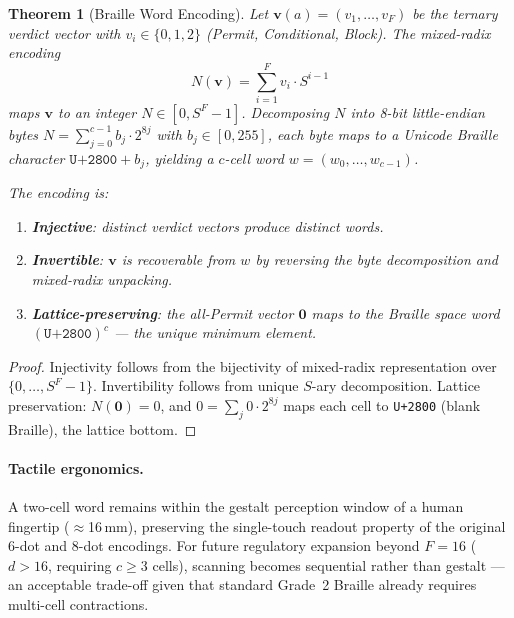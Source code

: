 \documentclass[11pt,twocolumn]{article}
\newtheorem{theorem}{Theorem}
\begin{document}
\begin{theorem}[Braille Word Encoding]
\label{thm:braille-word}
Let $\mathbf{v}(a) = (v_1, \ldots, v_F)$ be the ternary verdict vector
with $v_i \in \{0, 1, 2\}$ (Permit, Conditional, Block).
The mixed-radix encoding
\begin{equation}
  N(\mathbf{v}) = \sum_{i=1}^{F} v_i \cdot S^{i-1}
  \label{eq:mixed-radix}
\end{equation}
maps $\mathbf{v}$ to an integer $N \in [0, S^F - 1]$.
Decomposing $N$ into 8-bit little-endian bytes
$N = \sum_{j=0}^{c-1} b_j \cdot 2^{8j}$ with $b_j \in [0, 255]$,
each byte maps to a Unicode Braille character
$\texttt{U+2800} + b_j$, yielding a $c$-cell word
$w = (w_0, \ldots, w_{c-1})$.

\noindent
The encoding is:
\begin{enumerate}
  \item \textbf{Injective}: distinct verdict vectors produce distinct words.
  \item \textbf{Invertible}: $\mathbf{v}$ is recoverable from $w$ by
        reversing the byte decomposition and mixed-radix unpacking.
  \item \textbf{Lattice-preserving}: the all-Permit vector
        $\mathbf{0}$ maps to the Braille space word
        $(\texttt{U+2800})^c$ --- the unique minimum element.
\end{enumerate}
\end{theorem}

\begin{proof}
Injectivity follows from the bijectivity of mixed-radix representation
over $\{0,\ldots,S^F-1\}$. Invertibility follows from unique $S$-ary
decomposition. Lattice preservation: $N(\mathbf{0}) = 0$, and
$0 = \sum_{j} 0 \cdot 2^{8j}$ maps each cell to \texttt{U+2800}
(blank Braille), the lattice bottom.
\end{proof}

\paragraph{Tactile ergonomics.}
A two-cell word remains within the gestalt perception window of a
human fingertip ($\approx$16\,mm), preserving the single-touch readout
property of the original 6-dot and 8-dot encodings.
For future regulatory expansion beyond $F=16$ ($d > 16$, requiring
$c \geq 3$ cells), scanning becomes sequential rather than gestalt ---
an acceptable trade-off given that standard Grade~2 Braille already
requires multi-cell contractions.
\end{document}

